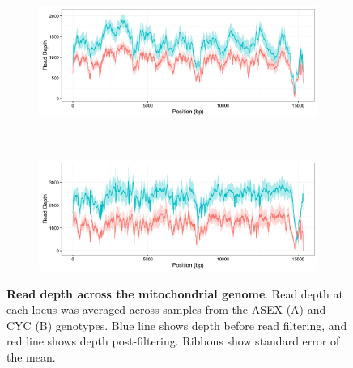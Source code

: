 \documentclass[12pt,twoside]{reedthesis}
\begin{document}
\begin{figure}[!h]
     \begin{subfigure}[t]{1\textwidth}
        \centering
        \includegraphics[width=1\linewidth]{../figures/LIN_coverage.jpeg}
        \label{coverage:LIN}
    \end{subfigure}%
    \\
    \begin{subfigure}[t]{1\textwidth}
        \centering
        \includegraphics[width=1\linewidth]{../figures/TCO_coverage.jpeg}
        \label{TCO}
    \end{subfigure}
    \caption[Read depth across the mitochondrial genome]{\textbf{Read depth across the mitochondrial genome}. Read depth at each locus was averaged across samples from the ASEX (A) and CYC (B) genotypes. Blue line shows depth before read filtering, and red line shows depth post-filtering. Ribbons show standard error of the mean.}
    \label{coverage}
\end{figure}
\end{document}
